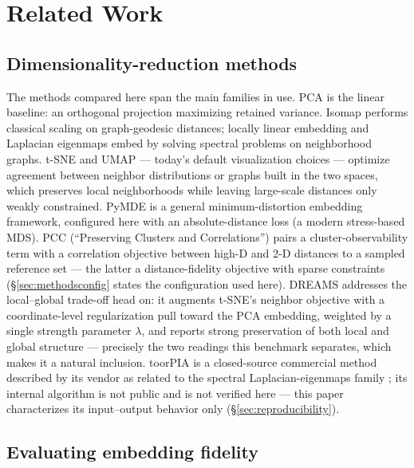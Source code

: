 \documentclass[11pt]{article}
\begin{document}
\section{Related Work}
\label{sec:related}

\subsection{Dimensionality-reduction methods}

The methods compared here span the main families in use. PCA
\cite{hotelling1933pca} is the linear baseline: an orthogonal projection
maximizing retained variance. Isomap \cite{tenenbaum2000isomap} performs
classical scaling on graph-geodesic distances; locally linear embedding
\cite{roweis2000lle} and Laplacian eigenmaps \cite{belkin2003laplacian}
embed by solving spectral problems on neighborhood graphs. t-SNE
\cite{vandermaaten2008tsne} and UMAP \cite{mcinnes2018umap} --- today's
default visualization choices --- optimize agreement between neighbor
distributions or graphs built in the two spaces, which preserves local
neighborhoods while leaving large-scale distances only weakly constrained.
PyMDE \cite{agrawal2021pymde} is a general minimum-distortion embedding
framework, configured here with an absolute-distance loss (a modern
stress-based MDS). PCC (``Preserving Clusters and Correlations'')
\cite{pcc2025} pairs a cluster-observability term with a correlation
objective between high-D and 2-D distances to a sampled reference set ---
the latter a distance-fidelity objective with sparse constraints
(\S\ref{sec:methodsconfig} states the configuration used here). DREAMS
\cite{kury2026dreams} addresses the local--global trade-off head on: it
augments t-SNE's neighbor objective with a coordinate-level regularization
pull toward the PCA embedding, weighted by a single strength parameter
$\lambda$, and reports strong preservation of both local and global
structure --- precisely the two readings this benchmark separates, which
makes it a natural inclusion. toorPIA is a closed-source commercial
method described by its vendor as related to the spectral
Laplacian-eigenmaps family \cite{belkin2003laplacian}; its internal
algorithm is not public and is not verified here --- this paper
characterizes its input--output behavior only
(\S\ref{sec:reproducibility}).

\subsection{Evaluating embedding fidelity}
\end{document}
